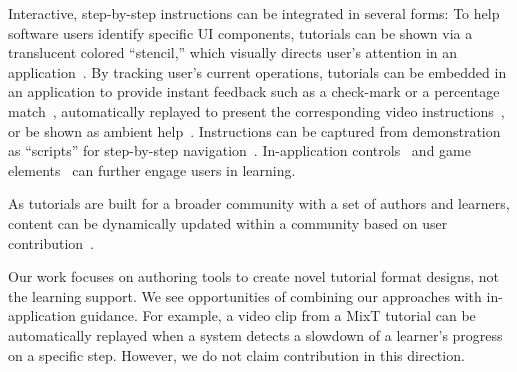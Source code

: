 Interactive, step-by-step instructions can be integrated in several forms:
%
To help software users identify specific UI components, tutorials can be shown via a translucent colored ``stencil,'' which visually directs user's attention in an application~\cite{Kelleher:2005:STD:1054972.1055047}.
%
By tracking user's current operations, tutorials can be embedded in an application to provide instant feedback such as a check-mark or a percentage match~\cite{Fernquist:2011:SRE:2047196.2047245}, automatically replayed to present the corresponding video instructions~\cite{Pongnumkul:2011ju}, or be shown as ambient help~\cite{Matejka:2011:AH:1978942.1979349}.
%
Instructions can be captured from demonstration as ``scripts'' for step-by-step navigation~\cite{Bergman:2005:DocWizards}. In-application controls~\cite{Lieberman:2014:SML:2557500.2557543} and game elements~\cite{Li:2014:CGM:2556288.2556954, Dontcheva:2014:CCL:2556288.2557217} can further engage users in learning.

As tutorials are built for a broader community with a set of authors and learners, content can be dynamically updated within a community based on user contribution~\cite{Lafreniere:2013ff,Matejka:2009:CCR:1622176.1622214, Bunt:2014:TPI:2556288.2557118}.

Our work focuses on authoring tools to create novel tutorial format designs, not the learning support. We see opportunities of combining our approaches with in-application guidance. For example, a video clip from a MixT tutorial can be automatically replayed when a system detects a slowdown of a learner's progress on a specific step. However, we do not claim contribution in this direction.





